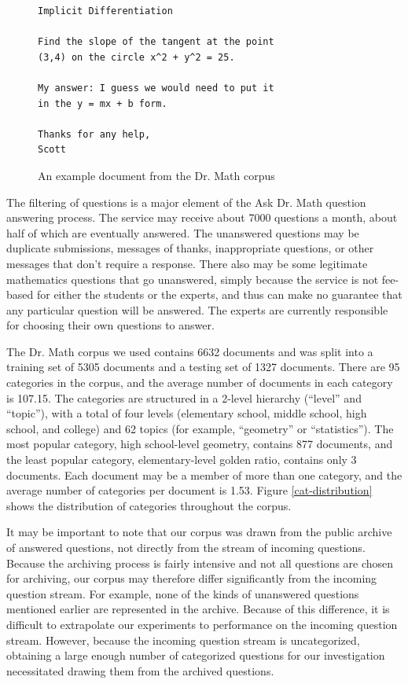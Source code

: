 \documentclass{article}
\begin{document}
\begin{figure}
\begin{verbatim}
Implicit Differentiation

Find the slope of the tangent at the point
(3,4) on the circle x^2 + y^2 = 25.

My answer: I guess we would need to put it
in the y = mx + b form. 

Thanks for any help,
Scott
\end{verbatim}
\caption{An example document from the Dr. Math corpus}
\label{example-question}
\end{figure}

The filtering of questions is a major element of the Ask Dr. Math
question answering process.  The service may receive about 7000
questions a month, about half of which are eventually answered.  The
unanswered questions may be duplicate submissions, messages of thanks,
inappropriate questions, or other messages that don't require a
response.  There also may be some legitimate mathematics questions
that go unanswered, simply because the service is not fee-based for
either the students or the experts, and thus can make no guarantee
that any particular question will be answered.  The experts are
currently responsible for choosing their own questions to answer.

The Dr. Math corpus we used contains 6632 documents and was split into a training
set of 5305 documents and a testing set of 1327 documents.  There are 95 categories 
in the corpus, and the average number of documents in each category is
107.15.  The categories are structured in a 2-level hierarchy
(``level'' and ``topic''), with a total of four levels (elementary
school, middle school, high school, and college) and 62 topics (for
example, ``geometry'' or ``statistics'').
The most popular category, high school-level geometry,
contains 877 documents, and the least popular category,
elementary-level golden ratio, contains only 3 documents.  Each
document may be a member of more than one category, and the average
number of categories per document is 1.53.  Figure
\ref{cat-distribution} shows the distribution of categories throughout
the corpus.

It may be important to note that our corpus was drawn from the public
archive of answered questions, not directly from the stream of
incoming questions.  Because the archiving process is fairly intensive
and not all questions are chosen for archiving, our corpus may
therefore differ significantly from the incoming question stream.  For
example, none of the kinds of unanswered questions mentioned earlier
are represented in the archive.  Because of this difference, it is
difficult to extrapolate our experiments to performance on the
incoming question stream.  However, because the incoming question
stream is uncategorized, obtaining a large enough number of
categorized questions for our investigation necessitated drawing them
from the archived questions.
\end{document}

